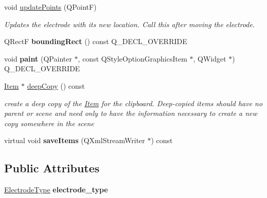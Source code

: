\begin{DoxyCompactItemize}
\item 
void \hyperlink{classprim_1_1Electrode_aa0036facf3e638e569235e2ee51e87c9}{update\+Points} (Q\+PointF)\hypertarget{classprim_1_1Electrode_aa0036facf3e638e569235e2ee51e87c9}{}\label{classprim_1_1Electrode_aa0036facf3e638e569235e2ee51e87c9}

\begin{DoxyCompactList}\small\item\em Updates the electrode with its new location. Call this after moving the electrode. \end{DoxyCompactList}\item 
Q\+RectF {\bfseries bounding\+Rect} () const Q\+\_\+\+D\+E\+C\+L\+\_\+\+O\+V\+E\+R\+R\+I\+DE\hypertarget{classprim_1_1Electrode_a39a58d3775880574d3f1f2d56cd3d9b3}{}\label{classprim_1_1Electrode_a39a58d3775880574d3f1f2d56cd3d9b3}

\item 
void {\bfseries paint} (Q\+Painter $\ast$, const Q\+Style\+Option\+Graphics\+Item $\ast$, Q\+Widget $\ast$) Q\+\_\+\+D\+E\+C\+L\+\_\+\+O\+V\+E\+R\+R\+I\+DE\hypertarget{classprim_1_1Electrode_afc04c7a7e27284d25519e26e073374f7}{}\label{classprim_1_1Electrode_afc04c7a7e27284d25519e26e073374f7}

\item 
\hyperlink{classprim_1_1Item}{Item} $\ast$ \hyperlink{classprim_1_1Electrode_a7a0a1265c745436bcd3ebe71a41751bc}{deep\+Copy} () const \hypertarget{classprim_1_1Electrode_a7a0a1265c745436bcd3ebe71a41751bc}{}\label{classprim_1_1Electrode_a7a0a1265c745436bcd3ebe71a41751bc}

\begin{DoxyCompactList}\small\item\em create a deep copy of the \hyperlink{classprim_1_1Item}{Item} for the clipboard. Deep-\/copied items should have no parent or scene and need only to have the information necessary to create a new copy somewhere in the scene \end{DoxyCompactList}\item 
virtual void {\bfseries save\+Items} (Q\+Xml\+Stream\+Writer $\ast$) const \hypertarget{classprim_1_1Electrode_a6c5afc878f2b8e25f22bef977da0340d}{}\label{classprim_1_1Electrode_a6c5afc878f2b8e25f22bef977da0340d}

\end{DoxyCompactItemize}
\subsection*{Public Attributes}
\begin{DoxyCompactItemize}
\item 
\hyperlink{classprim_1_1Electrode_a6b0ec865c0415eb2d43089c8c10ed389}{Electrode\+Type} {\bfseries electrode\+\_\+type}\hypertarget{classprim_1_1Electrode_a1e5555cb6418d80556719ae60e4191fc}{}\label{classprim_1_1Electrode_a1e5555cb6418d80556719ae60e4191fc}

\end{DoxyCompactItemize}

